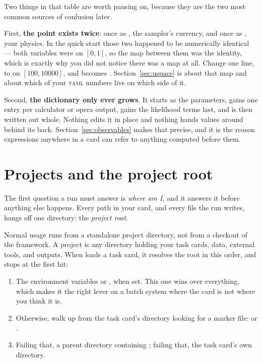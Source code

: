 Two things in that table are worth pausing on, because they are the two most common
sources of confusion later.

First, \textbf{the point exists twice}: once as , the sampler's currency, and
once as , your physics. In the quick start those two happened to be numerically
identical --- both variables were  on $[0,1]$, so the map between them was
the identity, which is exactly why you did not notice there was a map at all. Change one
line, to  on $[100, 10000]$, and  becomes .
Section~\ref{sec:uspace} is about that map and about which of your \textsc{yaml} numbers
live on which side of it.

Second, \textbf{the dictionary only ever grows}. It starts as the parameters, gains one
entry per calculator or opera output, gains the likelihood terms last, and is then
written out whole. Nothing edits it in place and nothing hands values around behind its
back. Section~\ref{sec:observables} makes that precise, and it is the reason expressions
anywhere in a card can refer to anything computed before them.

\section{Projects and the project root}
\label{sec:projects}

The first question a run must answer is \emph{where am I}, and it answers it before
anything else happens. Every path in your card, and every file the run writes, hangs off
one directory: the \emph{project root}.

Normal usage runs from a standalone project directory, not from a checkout of the
framework. A project is any directory holding your task cards, data, external tools, and
outputs. When  loads a task card, it resolves the root in this order, and
stops at the first hit:

\begin{enumerate}
  \item The environment variables  or
        , when set. This one wins over everything, which makes it
        the right lever on a batch system where the card is not where you think it is.
  \item Otherwise, walk up from the task card's directory looking for a marker file:
         or .
  \item Failing that, a parent directory containing ; failing that, the task
        card's own directory.
\end{enumerate}

